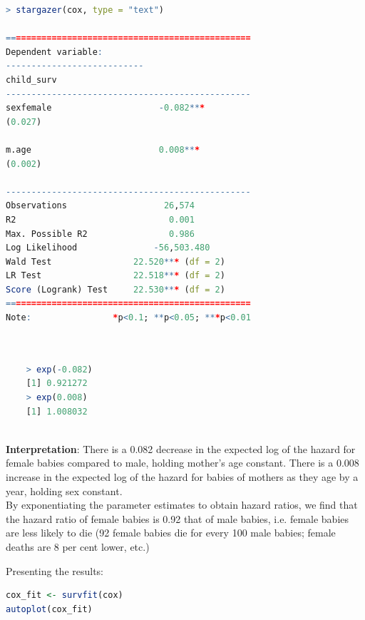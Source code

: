 \documentclass[12pt,letterpaper]{article}
\begin{document}
\begin{lstlisting}[language=R]
> stargazer(cox, type = "text")

================================================
Dependent variable:    
---------------------------
child_surv         
------------------------------------------------
sexfemale                     -0.082***         
(0.027)          

m.age                         0.008***          
(0.002)          

------------------------------------------------
Observations                   26,574           
R2                              0.001           
Max. Possible R2                0.986           
Log Likelihood               -56,503.480        
Wald Test                22.520*** (df = 2)     
LR Test                  22.518*** (df = 2)     
Score (Logrank) Test     22.530*** (df = 2)     
================================================
Note:                *p<0.1; **p<0.05; ***p<0.01
	
\end{lstlisting}

\begin{lstlisting}[language=R]
	
	> exp(-0.082)
	[1] 0.921272
	> exp(0.008)
	[1] 1.008032
	
\end{lstlisting}

\vspace{2.25cm}

\noindent \textbf{Interpretation}: There is a 0.082 decrease in the expected log of the hazard for female babies compared to 
male, holding mother's age constant. There is a 0.008 increase in the expected log of the hazard for babies of mothers as they age by a year, holding sex constant.\\

\noindent By exponentiating the parameter estimates to obtain hazard ratios, we find that the hazard ratio of female babies is 0.92 that of male babies, i.e. female babies are less
likely to die (92 female babies die for every 100 male babies; female deaths are 8 per cent lower, etc.)


\newpage

\noindent Presenting the results:

\begin{lstlisting}[language=R]
cox_fit <- survfit(cox)
autoplot(cox_fit)
\end{lstlisting}
\end{document}
